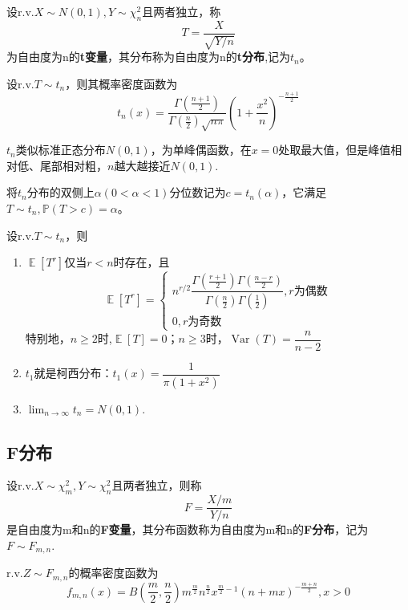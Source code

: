 \documentclass{ctexbook}
\DeclareMathOperator{\Var}{Var}          %
\DeclareMathOperator{\E}{\mathbb{E}}     %
\newcommand{\rv}{\text{r.v.}}             %
\begin{document}
\begin{definition}
    设$\rv X\sim N(0,1),Y\sim \chi_n^2$且两者独立，称
    $$T=\frac{X}{\sqrt{Y/n}}$$
    为自由度为n的\textbf{t变量}，其分布称为自由度为n的\textbf{t分布},记为$t_n$。
\end{definition}

\begin{theorem}
    设$\rv T\sim t_n$，则其概率密度函数为
    $$t_n(x)=\frac{\Gamma(\frac{n+1}{2})}{\Gamma(\frac{n}{2})\sqrt{n\pi}}\left(1+\frac{x^2}{n}\right)^{-\frac{n+1}{2}}$$
\end{theorem}

$t_n$类似标准正态分布$N(0,1)$，为单峰偶函数，在$x=0$处取最大值，但是峰值相对低、尾部相对粗，$n$越大越接近$N(0,1)$.

将$t_n$分布的双侧上$\alpha(0<\alpha<1)$分位数记为$c=t_n(\alpha)$，它满足$T\sim t_n,\mathbb{P}(T>c)=\alpha$。

\begin{proposition}[$t_n$变量的性质]
    设$\rv T\sim t_n$，则\begin{enumerate}
        \item $\E[T^r]$仅当$r<n$时存在，且
        $$\E[T^r]=\begin{cases}
            n^{r/2}\dfrac{\Gamma(\frac{r+1}{2})\Gamma(\frac{n-r}{2})}{\Gamma(\frac{n}{2})\Gamma(\frac{1}{2})},r\text{为偶数}\\
            0,r\text{为奇数}
        \end{cases}$$
        特别地，$n\ge 2$时,$\E[T]=0$；$n\ge 3$时，$\Var(T)=\dfrac{n}{n-2}$
        \item $t_1$就是柯西分布：$t_1(x)=\dfrac{1}{\pi(1+x^2)}$
        \item $\lim_{n\to\infty}t_n=N(0,1)$.
    \end{enumerate}
\end{proposition}

\subsection{F分布}

\begin{definition}
    设$\rv X\sim \chi_m^2,Y\sim\chi_n^2$且两者独立，则称
    $$F=\frac{X/m}{Y/n}$$
    是自由度为m和n的\textbf{F变量}，其分布函数称为自由度为m和n的\textbf{F分布}，记为$F\sim F_{m,n}$.
\end{definition}

\begin{theorem}
    $\rv Z\sim F_{m,n}$的概率密度函数为
    $$f_{m,n}(x)=B\left(\frac{m}{2},\frac{n}{2}\right)m^{\frac{m}{2}}n^{\frac{n}{2}}x^{\frac{m}{2}-1}(n+mx)^{-\frac{m+n}{2}},x>0$$
\end{theorem}
\end{document}
